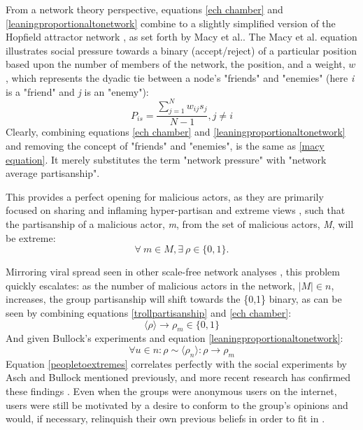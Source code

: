 \documentclass[preprint,review,12pt]{elsarticle}
\begin{document}
 From a network theory perspective, equations \ref{ech chamber} and \ref{leaningproportionaltonetwork} combine to a slightly simplified version of the Hopfield attractor network \cite{hopfield1982neural,hopfield1985neural,nowak1998toward,kitts1999structural}, as set forth by Macy et al.\cite{macy2003polarization}. The Macy et al. equation illustrates social pressure towards a binary (accept/reject) of a particular position based upon the number of members of the network, the position, and a weight, $w$, which represents the dyadic tie between a node's "friends" and "enemies" (here \textit{i} is a "friend" and \textit{j} is an "enemy"):
\begin{equation}
 \label{macy equation}
 P_{is}=\frac{\sum^{N}_{j=1}w_{ij}s_{j}}{N-1},j\neq i
\end{equation}
Clearly, combining equations \ref{ech chamber} and \ref{leaningproportionaltonetwork} and removing the concept of "friends" and "enemies", is the same as \ref{macy equation}. It merely substitutes the term "network pressure" with "network average partisanship".
 
 
This provides a perfect opening for malicious actors, as they are primarily focused on sharing and inflaming hyper-partisan and extreme views \cite{shin2018diffusion,bastos2019brexit,hegelich2016social,mueller2019mueller}, such that the partisanship of a malicious actor, \textit{m}, from the set of malicious actors, \textit{M}, will be extreme: 
\begin{equation}
\label{trollpartisanship}
\forall \ m \in M, \exists \ \rho \in \{0,1\}.
\end{equation}

Mirroring viral spread seen in other scale-free network analyses \cite{pastor2001epidemic,cohen2003efficient}, this problem quickly escalates: as the number of malicious actors in the network, $|M| \in n$, increases, the group partisanship will shift towards the \{0,1\} binary, as can be seen by combining equations \ref{trollpartisanship} and \ref{ech chamber}: 
\begin{equation}
\langle \rho \rangle \rightarrow \rho_m \in \{0,1\}
\end{equation} 
And given Bullock's experiments and equation \ref{leaningproportionaltonetwork}:
\begin{equation}
\label{peopletoextremes}
    \forall u \in n: \rho \sim \langle \rho_n \rangle: \rho \rightarrow \rho_m
\end{equation}
Equation \ref{peopletoextremes} correlates perfectly with the social experiments by Asch and Bullock mentioned previously, and more recent research has confirmed these findings \cite{colliander2019fake,edelson2011following}. Even when the groups were anonymous users on the internet, users were still be motivated by a desire to conform to the group's opinions and would, if necessary, relinquish their own previous beliefs in order to fit in \cite{williams2000cyberostracism,zhu2012switch,tsikerdekis2013effects,breitsohl2015groupthink,winter2015they,hamilton2017s}. 
\end{document}
